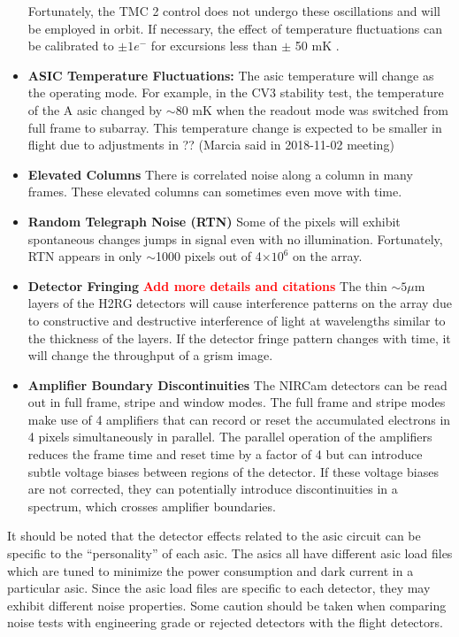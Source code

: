 \documentclass{aastex62}
\begin{document}
\begin{itemize}[noitemsep]
Fortunately, the TMC 2 control does not undergo these oscillations and will be employed in orbit.
If necessary, the effect of temperature fluctuations can be calibrated to $\pm 1 e^-$ for excursions less than $\pm$ 50 mK \citep{hall2005jwstArrays}.
	\item \textbf{ASIC Temperature Fluctuations:} The asic temperature will change as the operating mode. For example, in the CV3 stability test, the temperature of the A asic changed by $\sim$80 mK when the readout mode was switched from full frame to subarray. This temperature change is expected to be smaller in flight due to adjustments in ?? (Marcia said in 2018-11-02 meeting)
	\item \textbf{Elevated Columns} There is correlated noise along a column in many frames. These elevated columns can sometimes even move with time.
	\item \textbf{Random Telegraph Noise (RTN)} Some of the pixels will exhibit spontaneous changes jumps in signal even with no illumination. Fortunately, RTN appears in only $\sim$1000 pixels out of 4$\times 10^6$ on the array.
	\item \textbf{Detector Fringing} \textbf{\textcolor{red}{Add more details and citations}} The thin $\sim 5\mu$m layers of the H2RG detectors will cause interference patterns on the array due to constructive and destructive interference of light at wavelengths similar to the thickness of the layers. If the detector fringe pattern changes with time, it will change the throughput of a grism image.
	\item \textbf{Amplifier Boundary Discontinuities} The NIRCam detectors can be read out in full frame, stripe and window modes. The full frame and stripe modes make use of 4 amplifiers that can record or reset the accumulated electrons in 4 pixels simultaneously in parallel. The parallel operation of the amplifiers reduces the frame time and reset time by a factor of 4 but can introduce subtle voltage biases between regions of the detector. If these voltage biases are not corrected, they can potentially introduce discontinuities in a spectrum, which crosses amplifier boundaries.
\end{itemize}

It should be noted that the detector effects related to the asic circuit can be specific to the ``personality'' of each asic. The asics all have different asic load files which are tuned to minimize the power consumption and dark current in a particular asic. Since the asic load files are specific to each detector, they may exhibit different noise properties.
Some caution should be taken when comparing noise tests with engineering grade or rejected detectors with the flight detectors.
\end{document}
